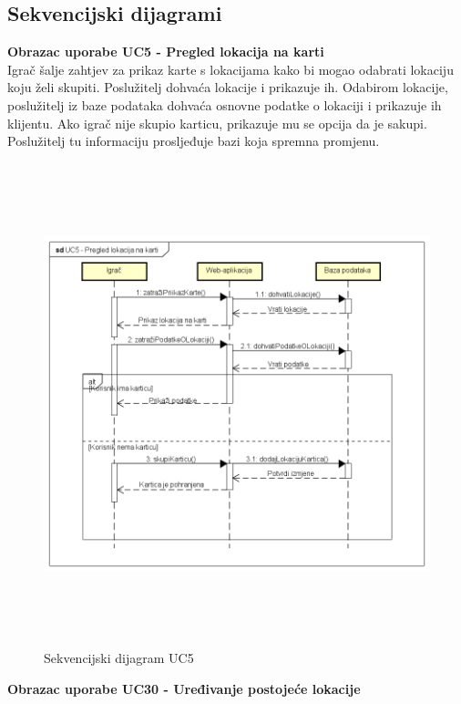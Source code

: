 					
				\eject		
				
			\subsection{Sekvencijski dijagrami}
			
				\textbf{Obrazac uporabe UC5 - Pregled lokacija na karti}\\
					
					{Igrač šalje zahtjev za prikaz karte s lokacijama kako bi mogao odabrati lokaciju koju želi skupiti. Poslužitelj dohvaća lokacije i prikazuje ih. Odabirom lokacije, poslužitelj iz baze podataka dohvaća osnovne podatke o lokaciji i prikazuje ih klijentu. Ako igrač nije skupio karticu, prikazuje mu se opcija da je sakupi. Poslužitelj tu informaciju prosljeđuje bazi koja spremna promjenu.}\\
					
					\begin{figure}[H]
						\includegraphics[width=\linewidth, height=14cm]{dijagrami/sd_UC5}
						\centering
						\caption{Sekvencijski dijagram UC5}
						\label{}
					\end{figure}
				\newpage	
				
				\textbf{Obrazac uporabe UC30 - Uređivanje postojeće lokacije}\\
					
